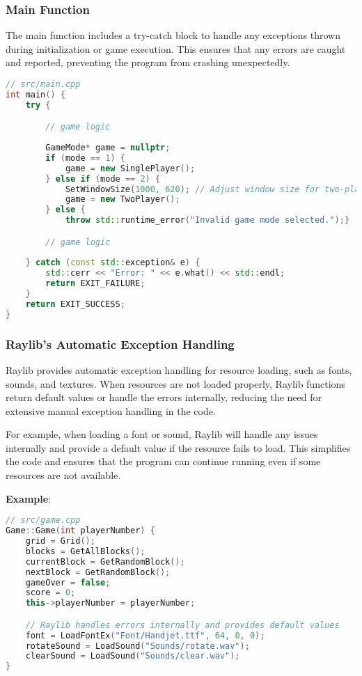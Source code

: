 \documentclass{article}
\begin{document}
\subsubsection{Main Function}

The main function includes a try-catch block to handle any exceptions thrown during initialization or game execution. This ensures that any errors are caught and reported, preventing the program from crashing unexpectedly.

\begin{lstlisting}[language=C++]
// src/main.cpp
int main() {
    try {

        // game logic 
        
        GameMode* game = nullptr;
        if (mode == 1) {
            game = new SinglePlayer();
        } else if (mode == 2) {
            SetWindowSize(1000, 620); // Adjust window size for two-player mode
            game = new TwoPlayer();
        } else {
            throw std::runtime_error("Invalid game mode selected.");}

        // game logic 
        
    } catch (const std::exception& e) {
        std::cerr << "Error: " << e.what() << std::endl;
        return EXIT_FAILURE;
    }
    return EXIT_SUCCESS;
}
\end{lstlisting}

\subsubsection{Raylib's Automatic Exception Handling}

Raylib provides automatic exception handling for resource loading, such as fonts, sounds, and textures. When resources are not loaded properly, Raylib functions return default values or handle the errors internally, reducing the need for extensive manual exception handling in the code.

For example, when loading a font or sound, Raylib will handle any issues internally and provide a default value if the resource fails to load. This simplifies the code and ensures that the program can continue running even if some resources are not available.

\textbf{Example}:

\begin{lstlisting}[language=C++]
// src/game.cpp
Game::Game(int playerNumber) {
    grid = Grid();
    blocks = GetAllBlocks();
    currentBlock = GetRandomBlock();
    nextBlock = GetRandomBlock();
    gameOver = false;
    score = 0;
    this->playerNumber = playerNumber;

    // Raylib handles errors internally and provides default values
    font = LoadFontEx("Font/Handjet.ttf", 64, 0, 0);
    rotateSound = LoadSound("Sounds/rotate.wav");
    clearSound = LoadSound("Sounds/clear.wav");
}
\end{lstlisting}
\end{document}
